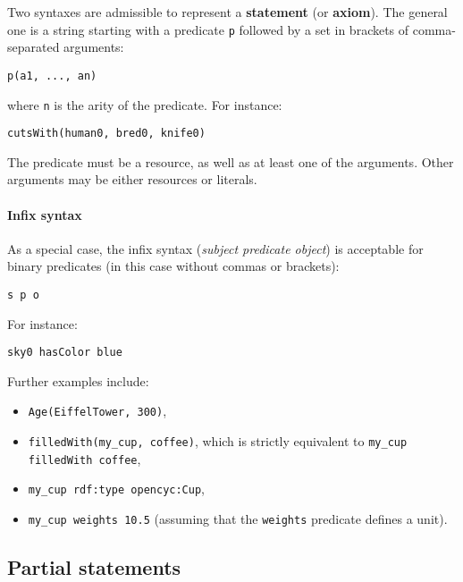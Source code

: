 Two syntaxes are admissible to represent a \textbf{statement} (or
\textbf{axiom}).  The general one is a string starting with a predicate
\texttt{p} followed by a set in brackets of comma-separated arguments:

    \begin{center} \tt p(a1, ..., an) \end{center}

where \texttt{n} is the arity of the predicate. For instance:

    \begin{center}  \tt cutsWith(human0, bred0, knife0) \end{center}

The predicate must be a resource, as well as at least one of the arguments.
Other arguments may be either resources or literals.

\paragraph{Infix syntax}

As a special case, the infix syntax (\emph{subject predicate object}) is
acceptable for binary predicates (in this case without commas or brackets):

    \begin{center} \tt s p o \end{center}

For instance:

    \begin{center} \tt sky0 hasColor blue \end{center}


Further examples include:

\begin{itemize}
    \item {\tt Age(EiffelTower, 300)},

    \item {\tt filledWith(my\_cup, coffee)}, which is strictly equivalent to
    {\tt my\_cup filledWith coffee},

    \item {\tt my\_cup rdf:type opencyc:Cup},

    \item {\tt my\_cup weights 10.5} (assuming that the {\tt weights} predicate
    defines a unit).

\end{itemize}

\subsection{Partial statements}

